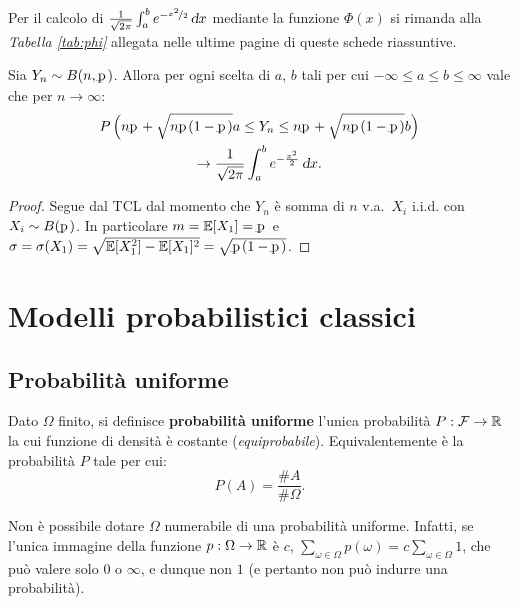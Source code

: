 \begin{multicols*}{2}
\begin{warn}
    Per il calcolo di $\frac{1}{\sqrt{2\pi}}\int_a^b e^{-\nicefrac{x^2}{2}} \dx$ mediante
    la funzione $\Phi(x)$ si rimanda
    alla \textit{Tabella \ref{tab:phi}} allegata nelle ultime pagine di queste schede riassuntive.
\end{warn}

\begin{corollary}
    Sia $Y_n \sim B(n, \pp)$. Allora per ogni scelta di $a$, $b$ tali per cui
    $-\infty \leq a \leq b \leq \infty$ vale che per $n \to \infty$:
    \begin{multline*}
        P\left(n\pp + \sqrt{n \pp (1- \pp)} a  \leq Y_n \leq n\pp + \sqrt{n \pp (1 - \pp)} b\right) \\
        \to \frac{1}{\sqrt{2\pi}}\int_a^b e^{-\frac{x^2}{2}} \dx.
    \end{multline*}
\end{corollary}

\begin{proof}
    Segue dal TCL dal momento che $Y_n$ è somma di $n$ v.a.~$X_i$ i.i.d. con $X_i \sim B(\pp)$. In particolare $m = \EE[X_1] = \pp$ e $\sigma = \sigma(X_1) = \sqrt{\EE[X_1^2] - \EE[X_1]^2} = \sqrt{\pp (1-\pp)}$.
\end{proof}

\section{Modelli probabilistici classici}

\subsection{Probabilità uniforme}

\begin{definition}
    Dato $\Omega$ finito, si definisce
    \textbf{probabilità uniforme} l'unica probabilità
    $P : \mathcal{F} \to \mathbb{R}$ la cui funzione di densità
    è costante (\textit{equiprobabile}). Equivalentemente è la probabilità
    $P$ tale per cui:
    \[
        P(A) = \frac{\#A}{\#\Omega}.
    \]
\end{definition}

\begin{remark}
    Non è possibile dotare $\Omega$ numerabile di una probabilità
    uniforme. Infatti, se l'unica immagine della funzione $p : \Omega \to \mathbb{R}$ è
    $c$, $\sum_{\omega \in \Omega} p(\omega) = c \sum_{\omega \in \Omega} 1$, che
    può valere solo $0$ o $\infty$, e dunque non $1$ (e pertanto non può indurre
    una probabilità).
\end{remark}


\end{multicols*}
